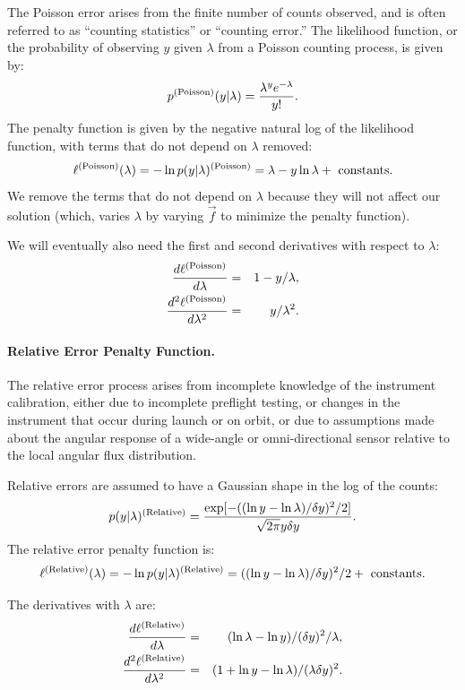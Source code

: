 \documentclass{article}    %
\newcommand{\subsubsubsection}[1]{\paragraph{#1.}}
\begin{document}
The Poisson error arises from the finite number of counts observed,
and is often referred to as ``counting statistics'' or ``counting
error.'' The likelihood function, or the probability of observing $y$
given $\lambda$ from a Poisson counting process, is given by:
\begin{equation}
p^{\rm (Poisson)}(y|\lambda) = \frac{\lambda^y e^{-\lambda}}{y!}.
\end{equation}
The penalty function is given by the negative natural log of the
likelihood function, with terms that do not depend on $\lambda$ removed:
\begin{equation}
\ell^{\rm (Poisson)}(\lambda) = -\ln p(y|\lambda)^{\rm (Poisson)} = \lambda-y\ln\lambda + {\rm ~ constants}.
\end{equation}
We remove the terms that do not depend on $\lambda$ because they will
not affect our solution (which, varies $\lambda$ by varying $\vec{f}$
to minimize the penalty function).

We will eventually also need the first and second derivatives with respect to $\lambda$:
\begin{eqnarray}
\frac{d \ell^{\rm (Poisson)}}{d \lambda} &=& 1-y/\lambda, \\
\frac{d^2 \ell^{\rm (Poisson)}}{d \lambda^2} &=& y/\lambda^2.
\end{eqnarray}

\subsubsubsection{Relative Error Penalty Function}

The relative error process arises from incomplete knowledge of the
instrument calibration, either due to incomplete preflight testing, or
changes in the instrument that occur during launch or on orbit, or due
to assumptions made about the angular response of a wide-angle or
omni-directional sensor relative to the local angular flux
distribution.

Relative errors are assumed to have a Gaussian shape in the
log of the counts:
\begin{equation}
p(y|\lambda)^{\rm (Relative)} = \frac{\exp[ -((\ln y-\ln\lambda)/\delta y)^2/2 ]}{\sqrt{2\pi}y\delta y}.
\end{equation}
The relative error penalty function is:
\begin{equation}
\ell^{\rm (Relative)}(\lambda) = -\ln p(y|\lambda)^{\rm (Relative)} = ((\ln y-\ln\lambda)/\delta y)^2/2 + {\rm ~ constants}.
\end{equation}

The derivatives with $\lambda$ are:
\begin{eqnarray}
\frac{d \ell^{\rm (Relative)}}{d \lambda} &=& (\ln\lambda-\ln y)/(\delta y)^2/\lambda, \\
\frac{d^2 \ell^{\rm (Relative)}}{d \lambda^2} &=& (1+\ln y - \ln \lambda)/(\lambda\delta y)^2.
\end{eqnarray}
\end{document}
